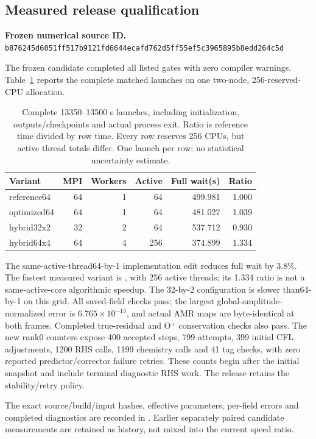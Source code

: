 \subsection{Measured release qualification}
\noindent\textbf{Frozen numerical source ID.} \nolinkurl{b876245d6051ff517b9121fd6644ecafd762d5ff55ef5c3965895b8edd264c5d}\par
The frozen candidate completed all listed gates with zero compiler warnings.
Table~\ref{tab:perf} reports the complete matched launches on one two-node,
256-reserved-CPU allocation.

\begin{table}[ht]
\centering\small
\begin{tabular}{lrrrrr}
\toprule Variant & MPI & Workers & Active & Full wait(s) & Ratio \\ \midrule
reference64 & 64 & 1 & 64 & 499.981 & 1.000 \\
optimized64 & 64 & 1 & 64 & 481.027 & 1.039 \\
hybrid32x2 & 32 & 2 & 64 & 537.712 & 0.930 \\
hybrid64x4 & 64 & 4 & 256 & 374.899 & 1.334 \\
\bottomrule
\end{tabular}
\caption{Complete 13350--13500 s launches, including initialization,
outputs/checkpoints and actual process exit. Ratio is reference time divided
by row time. Every row reserves 256 CPUs, but active thread totals differ.
One launch per row; no statistical uncertainty estimate.}\label{tab:perf}
\end{table}

The same-active-thread64-by-1 implementation edit reduces full wait by
3.8\%. The fastest measured variant is
, with 256 active threads; its
1.334 ratio is not a same-active-core algorithmic speedup.
The 32-by-2 configuration is slower than64-by-1 on this grid.
All saved-field checks pass; the largest global-amplitude-normalized
error is $6.765\times10^{-13}$, and actual AMR maps are byte-identical at both
frames. Completed true-residual and O$^+$ conservation checks also pass.
The new rank0 counters expose 400 accepted steps, 799 attempts, 399
initial CFL adjustments, 1200 RHS calls, 1199 chemistry calls and 41 tag
checks, with zero reported predictor/corrector failure retries. These
counts begin after the initial snapshot and include terminal diagnostic
RHS work. The release retains the stability/retry policy.

The exact source/build/input hashes, effective parameters, per-field errors
and completed diagnostics are recorded in .
Earlier separately paired candidate measurements are retained as history,
not mixed into the current speed ratio.
